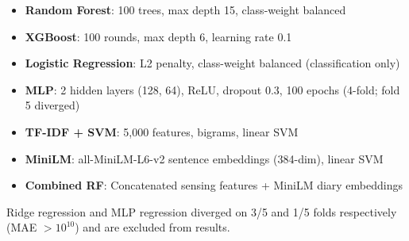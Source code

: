 \documentclass[screen,review,anonymous]{acmart}
\begin{document}
\begin{itemize}[nosep]
    \item \textbf{Random Forest}: 100 trees, max depth 15, class-weight balanced
    \item \textbf{XGBoost}: 100 rounds, max depth 6, learning rate 0.1
    \item \textbf{Logistic Regression}: L2 penalty, class-weight balanced (classification only)
    \item \textbf{MLP}: 2 hidden layers (128, 64), ReLU, dropout 0.3, 100 epochs (4-fold; fold 5 diverged)
    \item \textbf{TF-IDF + SVM}: 5,000 features, bigrams, linear SVM
    \item \textbf{MiniLM}: all-MiniLM-L6-v2 sentence embeddings (384-dim), linear SVM
    \item \textbf{Combined RF}: Concatenated sensing features + MiniLM diary embeddings
\end{itemize}

Ridge regression and MLP regression diverged on 3/5 and 1/5 folds respectively (MAE $>10^{10}$) and are excluded from results.
\end{document}
